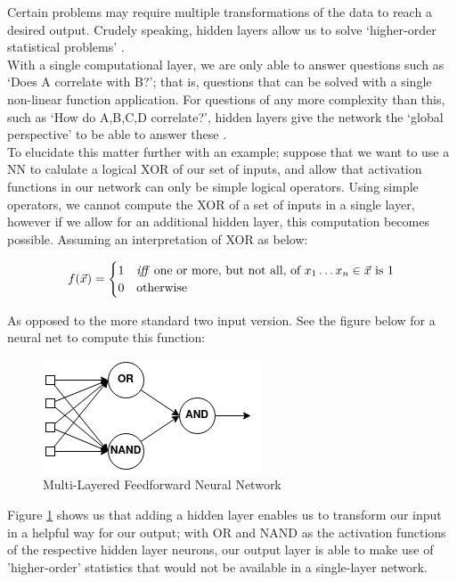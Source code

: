 \documentclass[12pt]{article}
\begin{document}
Certain problems may require multiple transformations of the data to reach a desired output. Crudely speaking, hidden layers allow us to solve `higher-order statistical problems' \autocite{ChurchlandPatriciaS2016CO}.\\\newline
With a single computational layer, we are only able to answer questions such as `Does A correlate with B?'; that is, questions that can be solved with a single non-linear function application. For questions of any more complexity than this, such as `How do A,B,C,D correlate?', hidden layers give the network the `global perspective' to be able to answer these \autocite{ChurchlandPatriciaS2016CO}.\\\newline
To elucidate this matter further with an example; suppose that we want to use a NN to calulate a logical XOR of our set of inputs, and allow that activation functions in our network can only be simple logical operators. Using simple operators, we cannot compute the XOR of a set of inputs in a single layer, however if we allow for an additional hidden layer, this computation becomes possible. Assuming an interpretation of XOR as below:
\begin{figure}[H]
    \[ f(\vec{x}) = \begin{cases} 
        1 & \text{\textit{iff} one or more, but not all, of $x_1\dots x_n \in \vec{x}$ is 1} \\
        0 & \text{otherwise}
     \end{cases}
  \]
\end{figure}
 As opposed to the more standard two input version. See the figure below for a neural net to compute this function: 
\begin{figure}[H]
    \centering
    \includegraphics[scale=0.8]{4.png}
    \caption{Multi-Layered Feedforward Neural Network}
    \label{multilayer}
\end{figure}
Figure \ref{multilayer} shows us that adding a hidden layer enables us to transform our input in a helpful way for our output; with OR and NAND as the activation functions of the respective hidden layer neurons, our output layer is able to make use of 'higher-order' statistics that would not be available in a single-layer network.\\\newline
\end{document}
